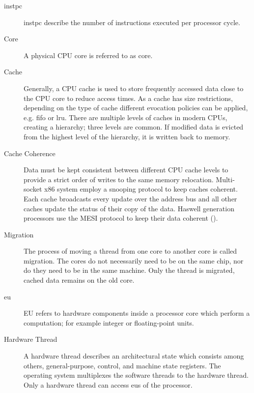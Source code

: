 \begin{description}
  \item[\Gls{instpc}] \Gls{instpc} describe the number of instructions executed
    per processor cycle.


  \item[Core] A physical CPU core is referred to as core.

  \item[Cache] Generally, a CPU cache is used to store frequently accessed data
    close to the CPU core to reduce access times.
    As a cache has size restrictions, depending on the type of cache different
    evocation policies can be applied, e.g. \gls{fifo} or \gls{lru}.
    There are multiple levels of caches in modern CPUs, creating a hierarchy;
    three levels are common.
    If modified data is evicted from the highest level of the hierarchy, it is
    written back to memory.

  \item[Cache Coherence] Data must be kept consistent between different CPU
    cache levels to provide a strict order of writes to the same memory
    relocation.
    Multi-socket x86 system employ a snooping protocol to keep caches coherent.
    Each cache broadcasts every update over the address bus and all other
    caches update the status of their copy of the data.
    Haswell generation processors use the MESI protocol to keep their data
    coherent (\cite[2-22]{intel_optimization_manual_2015}).

  \item[Migration] The process of moving a thread from one core to another core
    is called migration.
    The cores do not necessarily need to be on the same chip, nor do they need
    to be in the same machine. Only the thread is migrated, cached data remains
    on the old core.

  \item[\Gls{eu}] EU refers to hardware components inside a
    processor core which perform a computation; for example integer or
    floating-point units.

  \item[Hardware Thread] A hardware thread describes an architectural state
    which consists among others, general-purpose, control, and machine state
    registers.
    The operating system multiplexes the software threads to the hardware
    thread.
    Only a hardware thread can access \gls{eu}s of the processor.


\end{description}
